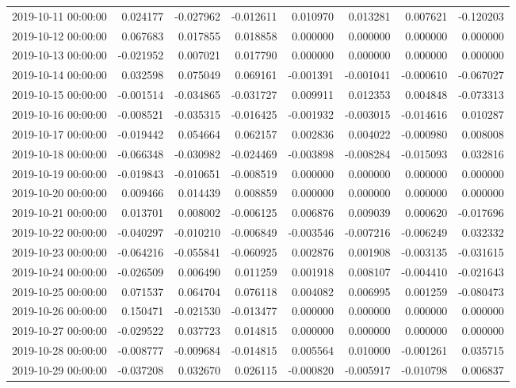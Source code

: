 \begin{tabular}{lrrrrrrr}
2019-10-11 00:00:00 & 0.024177 & -0.027962 & -0.012611 & 0.010970 & 0.013281 & 0.007621 & -0.120203 \\
2019-10-12 00:00:00 & 0.067683 & 0.017855 & 0.018858 & 0.000000 & 0.000000 & 0.000000 & 0.000000 \\
2019-10-13 00:00:00 & -0.021952 & 0.007021 & 0.017790 & 0.000000 & 0.000000 & 0.000000 & 0.000000 \\
2019-10-14 00:00:00 & 0.032598 & 0.075049 & 0.069161 & -0.001391 & -0.001041 & -0.000610 & -0.067027 \\
2019-10-15 00:00:00 & -0.001514 & -0.034865 & -0.031727 & 0.009911 & 0.012353 & 0.004848 & -0.073313 \\
2019-10-16 00:00:00 & -0.008521 & -0.035315 & -0.016425 & -0.001932 & -0.003015 & -0.014616 & 0.010287 \\
2019-10-17 00:00:00 & -0.019442 & 0.054664 & 0.062157 & 0.002836 & 0.004022 & -0.000980 & 0.008008 \\
2019-10-18 00:00:00 & -0.066348 & -0.030982 & -0.024469 & -0.003898 & -0.008284 & -0.015093 & 0.032816 \\
2019-10-19 00:00:00 & -0.019843 & -0.010651 & -0.008519 & 0.000000 & 0.000000 & 0.000000 & 0.000000 \\
2019-10-20 00:00:00 & 0.009466 & 0.014439 & 0.008859 & 0.000000 & 0.000000 & 0.000000 & 0.000000 \\
2019-10-21 00:00:00 & 0.013701 & 0.008002 & -0.006125 & 0.006876 & 0.009039 & 0.000620 & -0.017696 \\
2019-10-22 00:00:00 & -0.040297 & -0.010210 & -0.006849 & -0.003546 & -0.007216 & -0.006249 & 0.032332 \\
2019-10-23 00:00:00 & -0.064216 & -0.055841 & -0.060925 & 0.002876 & 0.001908 & -0.003135 & -0.031615 \\
2019-10-24 00:00:00 & -0.026509 & 0.006490 & 0.011259 & 0.001918 & 0.008107 & -0.004410 & -0.021643 \\
2019-10-25 00:00:00 & 0.071537 & 0.064704 & 0.076118 & 0.004082 & 0.006995 & 0.001259 & -0.080473 \\
2019-10-26 00:00:00 & 0.150471 & -0.021530 & -0.013477 & 0.000000 & 0.000000 & 0.000000 & 0.000000 \\
2019-10-27 00:00:00 & -0.029522 & 0.037723 & 0.014815 & 0.000000 & 0.000000 & 0.000000 & 0.000000 \\
2019-10-28 00:00:00 & -0.008777 & -0.009684 & -0.014815 & 0.005564 & 0.010000 & -0.001261 & 0.035715 \\
2019-10-29 00:00:00 & -0.037208 & 0.032670 & 0.026115 & -0.000820 & -0.005917 & -0.010798 & 0.006837 \\

\end{tabular}

